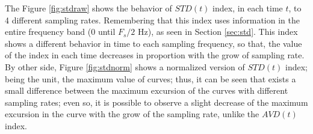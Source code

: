 \documentclass[review]{elsarticle}
\begin{document}
The Figure \ref{fig:stdraw} shows the  behavior of $STD(t)$ index, in each time $t$, 
to 4 different sampling rates. Remembering that this index uses information in the entire frequency
band ($0$ until $F_s/2$ Hz), as seen in Section \ref{sec:std}.
This index shows a different behavior in time to each sampling frequency,
so that, the value of the index in each time  decreases in proportion with 
the grow of sampling rate. By other side,
Figure \ref{fig:stdnorm} shows a normalized version of $STD(t)$ index;
being the unit, the maximum value of curves; thus,
it can be seen that exists a small difference between the maximum excursion 
of the curves with different sampling rates; even so, it is possible to observe
a slight decrease of the maximum excursion in the curve with the grow of the sampling rate, 
unlike the $AVD(t)$ index.
\end{document}
